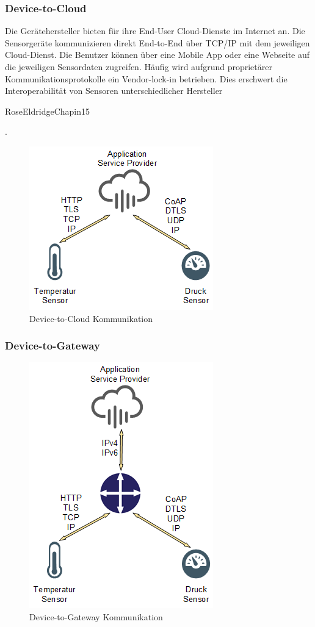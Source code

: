 \subsubsection{Device-to-Cloud}
Die Gerätehersteller bieten für ihre End-User Cloud-Dienste im Internet an. Die Sensorgeräte kommunizieren direkt End-to-End über TCP/IP mit dem jeweiligen Cloud-Dienst. Die Benutzer können über eine Mobile App oder eine Webseite auf die jeweiligen Sensordaten zugreifen. Häufig wird aufgrund proprietärer Kommunikationsprotokolle ein Vendor-lock-in betrieben. Dies erschwert die Interoperabilität von Sensoren unterschiedlicher Hersteller \caption{RoseEldridgeChapin15}.
\begin{figure}[H]
\centering
\includegraphics[scale=0.8]{images/device-to-cloud.png}
\caption{Device-to-Cloud Kommunikation}
\end{figure}
\subsubsection{Device-to-Gateway}
\begin{figure}[H]
\centering
\includegraphics[scale=0.8]{images/device-to-gateway.png}
\caption{Device-to-Gateway Kommunikation}
\end{figure}
